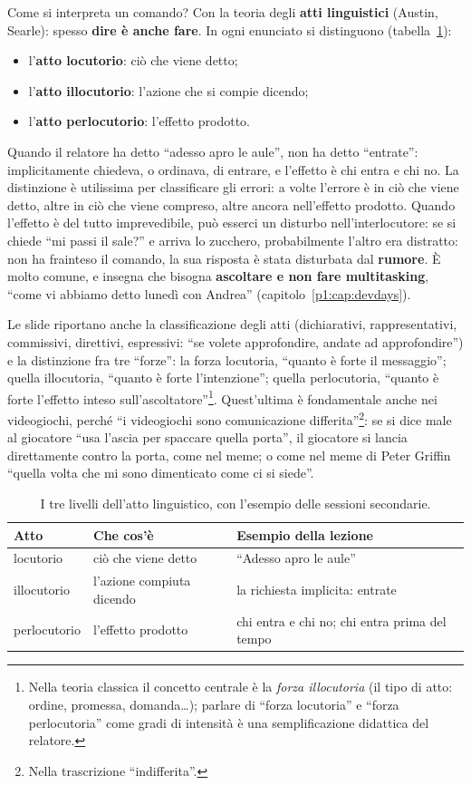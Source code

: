 Come si interpreta un comando? Con la teoria degli \textbf{atti linguistici}
(Austin, Searle): spesso \textbf{dire è anche fare}. In ogni enunciato si
distinguono (tabella~\ref{pt:tab:atti}):
\begin{itemize}
  \item l'\textbf{atto locutorio}: ciò che viene detto;
  \item l'\textbf{atto illocutorio}: l'azione che si compie dicendo;
  \item l'\textbf{atto perlocutorio}: l'effetto prodotto.
\end{itemize}
Quando il relatore ha detto ``adesso apro le aule'', non ha detto ``entrate'':
implicitamente chiedeva, o ordinava, di entrare, e l'effetto è chi entra e chi
no. La distinzione è utilissima per classificare gli errori: a volte l'errore
è in ciò che viene detto, altre in ciò che viene compreso, altre ancora
nell'effetto prodotto. Quando l'effetto è del tutto imprevedibile, può esserci
un disturbo nell'interlocutore: se si chiede ``mi passi il sale?'' e arriva lo
zucchero, probabilmente l'altro era distratto: non ha frainteso il comando, la
sua risposta è stata disturbata dal \textbf{rumore}. È molto comune, e insegna
che bisogna \textbf{ascoltare e non fare multitasking}, ``come vi abbiamo detto
lunedì con Andrea'' (capitolo~\ref{p1:cap:devdays}).

Le slide riportano anche la classificazione degli atti (dichiarativi,
rappresentativi, commissivi, direttivi, espressivi: ``se volete approfondire,
andate ad approfondire'') e la distinzione fra tre ``forze'': la forza
locutoria, ``quanto è forte il messaggio''; quella illocutoria, ``quanto è forte
l'intenzione''; quella perlocutoria, ``quanto è forte l'effetto inteso
sull'ascoltatore''\footnote{Nella teoria classica il concetto centrale è la
\emph{forza illocutoria} (il tipo di atto: ordine, promessa, domanda\dots);
parlare di ``forza locutoria'' e ``forza perlocutoria'' come gradi di intensità
è una semplificazione didattica del relatore.}. Quest'ultima è fondamentale
anche nei videogiochi, perché ``i videogiochi sono comunicazione
differita''\footnote{Nella trascrizione ``indifferita''.}: se si dice male al
giocatore ``usa l'ascia per spaccare quella porta'', il giocatore si lancia
direttamente contro la porta, come nel meme; o come nel meme di Peter Griffin
``quella volta che mi sono dimenticato come ci si siede''.

\begin{table}[htbp]
\centering
\small
\begin{tabular}{@{}lp{4.3cm}p{5.2cm}@{}}
\toprule
\textbf{Atto} & \textbf{Che cos'è} & \textbf{Esempio della lezione} \\
\midrule
locutorio & ciò che viene detto & ``Adesso apro le aule'' \\
illocutorio & l'azione compiuta dicendo & la richiesta implicita: entrate \\
perlocutorio & l'effetto prodotto & chi entra e chi no; chi entra prima del
tempo \\
\bottomrule
\end{tabular}
\caption{I tre livelli dell'atto linguistico, con l'esempio delle sessioni
secondarie.}
\label{pt:tab:atti}
\end{table}

